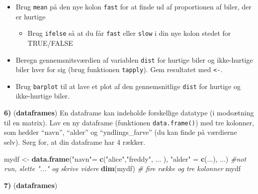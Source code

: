 \documentclass[
]{book}
\newenvironment{Shaded}{\begin{snugshade}}{\end{snugshade}}
\newcommand{\CommentTok}[1]{\textcolor[rgb]{0.56,0.35,0.01}{\textit{#1}}}
\newcommand{\DecValTok}[1]{\textcolor[rgb]{0.00,0.00,0.81}{#1}}
\newcommand{\FunctionTok}[1]{\textcolor[rgb]{0.13,0.29,0.53}{\textbf{#1}}}
\newcommand{\NormalTok}[1]{#1}
\newcommand{\OtherTok}[1]{\textcolor[rgb]{0.56,0.35,0.01}{#1}}
\newcommand{\SpecialCharTok}[1]{\textcolor[rgb]{0.81,0.36,0.00}{\textbf{#1}}}
\newcommand{\StringTok}[1]{\textcolor[rgb]{0.31,0.60,0.02}{#1}}
\providecommand{\tightlist}{%
  \setlength{\itemsep}{0pt}\setlength{\parskip}{0pt}}
\theoremstyle{definition}
\theoremstyle{definition}
\theoremstyle{definition}
\theoremstyle{definition}
\theoremstyle{remark}
\begin{document}
\begin{Shaded}
\end{Shaded}

\begin{itemize}
\tightlist
\item
  Brug \texttt{mean} på den nye kolon \texttt{fast} for at finde ud af proportionen af biler, der er hurtige

  \begin{itemize}
  \tightlist
  \item
    Brug \texttt{ifelse} så at du får \texttt{fast} eller \texttt{slow} i din nye kolon stedet for TRUE/FALSE
  \end{itemize}
\item
  Beregn gennemsnitsværdien af variablen \texttt{dist} for hurtige biler og ikke-hurtige biler hver for sig (brug funktionen \texttt{tapply}). Gem resultatet med \texttt{\textless{}-}.
\item
  Brug \texttt{barplot} til at lave et plot af den gennemsnitlige \texttt{dist} for hurtige og ikke-hurtige biler.
\end{itemize}

\textbf{6)} (\textbf{dataframes}) En dataframe kan indeholde forskellige datatype (i modsætning til en matrix). Lav en ny dataframe (funktionen \texttt{data.frame()}) med tre kolonner, som hedder ``navn'', ``alder'' og ``yndlings\_farve'' (du kan finde på værdierne selv). Sørg for, at din dataframe har 4 rækker.

\begin{Shaded}
\begin{Highlighting}[]
\NormalTok{mydf }\OtherTok{\textless{}{-}} \FunctionTok{data.frame}\NormalTok{(}\StringTok{"navn"}\OtherTok{=} \FunctionTok{c}\NormalTok{(}\StringTok{"alice"}\NormalTok{,}\StringTok{"freddy"}\NormalTok{, ... ), }\StringTok{"alder"} \OtherTok{=} \FunctionTok{c}\NormalTok{(...), ...) }\CommentTok{\#not run, slette "..." og skrive videre}
\FunctionTok{dim}\NormalTok{(mydf) }\CommentTok{\# fire række og tre kolonner}
\NormalTok{mydf}
\end{Highlighting}
\end{Shaded}

\textbf{7)} (\textbf{dataframes})
\end{document}
